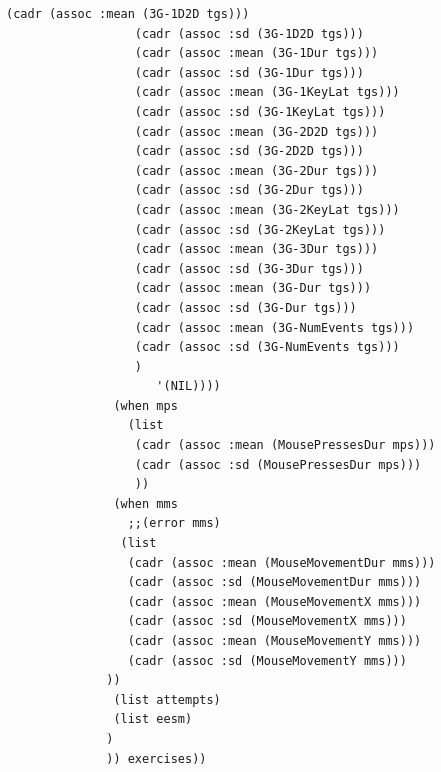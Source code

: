 \begin{lstlisting}[frame=single]
                  (cadr (assoc :mean (3G-1D2D tgs)))
                  (cadr (assoc :sd (3G-1D2D tgs)))
                  (cadr (assoc :mean (3G-1Dur tgs)))
                  (cadr (assoc :sd (3G-1Dur tgs)))
                  (cadr (assoc :mean (3G-1KeyLat tgs)))
                  (cadr (assoc :sd (3G-1KeyLat tgs)))
                  (cadr (assoc :mean (3G-2D2D tgs)))
                  (cadr (assoc :sd (3G-2D2D tgs)))
                  (cadr (assoc :mean (3G-2Dur tgs)))
                  (cadr (assoc :sd (3G-2Dur tgs)))
                  (cadr (assoc :mean (3G-2KeyLat tgs)))
                  (cadr (assoc :sd (3G-2KeyLat tgs)))
                  (cadr (assoc :mean (3G-3Dur tgs)))
                  (cadr (assoc :sd (3G-3Dur tgs)))
                  (cadr (assoc :mean (3G-Dur tgs)))
                  (cadr (assoc :sd (3G-Dur tgs)))
                  (cadr (assoc :mean (3G-NumEvents tgs)))
                  (cadr (assoc :sd (3G-NumEvents tgs)))
                  )
                     '(NIL))))
               (when mps
                 (list
                  (cadr (assoc :mean (MousePressesDur mps)))
                  (cadr (assoc :sd (MousePressesDur mps)))
                  ))
               (when mms
                 ;;(error mms)
                (list
                 (cadr (assoc :mean (MouseMovementDur mms)))
                 (cadr (assoc :sd (MouseMovementDur mms)))
                 (cadr (assoc :mean (MouseMovementX mms)))
                 (cadr (assoc :sd (MouseMovementX mms)))
                 (cadr (assoc :mean (MouseMovementY mms)))
                 (cadr (assoc :sd (MouseMovementY mms)))
              ))
               (list attempts)
               (list eesm)
              )
              )) exercises))
\end{lstlisting}
